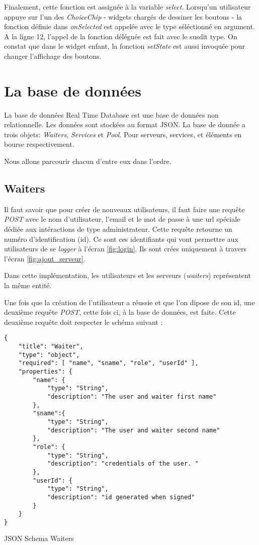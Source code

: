 Finalement, cette fonction est assignée à la variable \textit{select}. Lorsqu'un utilisateur appuye sur l'un des \textit{ChoiceChip} - widgets chargés de dessiner les boutons - la fonction définie dans \textit{onSelected} est appelée avec le type séléctionné en argument. A la ligne 12, l'appel de la fonction déléguée est fait avec le susdit type. On constat que dans le widget enfant, la fonction \textit{setState} est aussi invoquée pour changer l'affichage des boutons.

\section{La base de données}
La base de données Real Time Database est une base de données non relationnelle. Les données sont stockées au format JSON. La base de donnée a trois objets: \textit{Waiters}, \textit{Services} et \textit{Pool}. Pour serveurs, services, et éléments en bourse respectivement.

Nous allons parcourir chacun d'entre eux dans l'ordre.

\subsection*{Waiters}
Il faut savoir que pour créer de nouveaux utilisateurs, il faut faire une requête \textit{POST} avec le nom d'utilisateur, l'email et le mot de passe à une url spéciale dédiée aux intéractions de type administrateur. Cette requête retourne un numéro d'identification (id). Ce sont ces identifiants qui vont permettre aux utilisateurs de se \textit{logger} à l'écran \ref{fig:login}. Ils sont crées uniquement à travers l'écran \ref{fig:ajout_serveur}.

Dans cette implémentation, les utilisateurs et les serveurs (\textit{waiters}) représentent la même entité.

Une fois que la création de l'utilisateur a réussie et que l'on dipose de son id, une deuxième requête \textit{POST}, cette fois ci, à la base de données, est faite. Cette deuxième requête doit respecter le schéma suivant : 

\begin{listing}[!h]
\begin{verbatim}
{
    "title": "Waiter",
    "type": "object",
    "required": [ "name", "sname", "role", "userId" ],
    "properties": {
        "name": {
            "type": "String",
            "description": "The user and waiter first name"
        },
        "sname":{
            "type": "String",
            "description": "The user and waiter second name"
        },
        "role": {
            "type": "String",
            "description": "credentials of the user. "
        },
        "userId": {
            "type": "String",
            "description": "id generated when signed"
        }   
    }
}
\end{verbatim}
\caption{JSON Schema Waiters}
\label{schema:waiters}
\end{listing}


